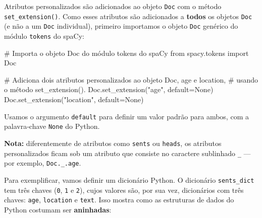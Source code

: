\documentclass[
  brazilian,
  11pt,
]{article}
\newenvironment{Shaded}{\begin{snugshade}}{\end{snugshade}}
\newcommand{\CommentTok}[1]{\textcolor[rgb]{0.48,0.49,0.49}{#1}}
\newcommand{\ImportTok}[1]{\textcolor[rgb]{0.15,0.68,0.38}{#1}}
\newcommand{\NormalTok}[1]{\textcolor[rgb]{0.81,0.81,0.76}{#1}}
\newcommand{\OperatorTok}[1]{\textcolor[rgb]{0.81,0.81,0.76}{#1}}
\newcommand{\StringTok}[1]{\textcolor[rgb]{0.96,0.31,0.31}{#1}}
\newcommand{\VariableTok}[1]{\textcolor[rgb]{0.15,0.68,0.68}{#1}}
\let\oldtexttt\texttt
\renewcommand{\texttt}[1]{{\color{inlink}\oldtexttt{#1}}}
\begin{document}
Atributos personalizados são adicionados ao objeto \texttt{Doc} com o
método \texttt{set\_extension()}. Como esses atributos são adicionados a
\textbf{todos} os objetos \texttt{Doc} (e não a um \texttt{Doc}
individual), primeiro importamos o objeto \texttt{Doc} genérico do
módulo \texttt{tokens} do spaCy:

\begin{Shaded}
\begin{Highlighting}[]
\CommentTok{\# Importa o objeto Doc do módulo \textquotesingle{}tokens\textquotesingle{} do spaCy}
\ImportTok{from}\NormalTok{ spacy.tokens }\ImportTok{import}\NormalTok{ Doc}

\CommentTok{\# Adiciona dois atributos personalizados ao objeto Doc, \textquotesingle{}age\textquotesingle{} e \textquotesingle{}location\textquotesingle{},}
\CommentTok{\# usando o método set\_extension().}
\NormalTok{Doc.set\_extension(}\StringTok{"age"}\NormalTok{, default}\OperatorTok{=}\VariableTok{None}\NormalTok{)}
\NormalTok{Doc.set\_extension(}\StringTok{"location"}\NormalTok{, default}\OperatorTok{=}\VariableTok{None}\NormalTok{)}
\end{Highlighting}
\end{Shaded}

Usamos o argumento \texttt{default} para definir um valor padrão para
ambos, com a palavra‑chave \texttt{None} do Python.

\begin{notebox}

\textbf{Nota:} diferentemente de atributos como \texttt{sents} ou
\texttt{heads}, os atributos personalizados ficam sob um atributo que
consiste no caractere sublinhado \texttt{\_} --- por exemplo,
\texttt{Doc.\_.age}.

\end{notebox}

Para exemplificar, vamos definir um dicionário Python. O dicionário
\texttt{sents\_dict} tem três chaves (\texttt{0}, \texttt{1} e
\texttt{2}), cujos valores são, por sua vez, dicionários com três
chaves: \texttt{age}, \texttt{location} e \texttt{text}. Isso mostra
como as estruturas de dados do Python costumam ser \textbf{aninhadas}:
\end{document}
